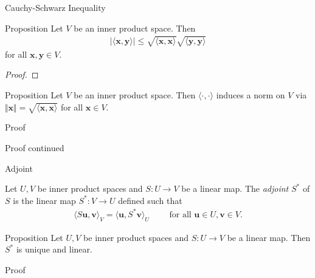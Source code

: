 \documentclass [aspectratio=169]{beamer}
\newcommand{\bu}{{\mathbf{u}}}
\newcommand{\bv}{{\mathbf{v}}}
\newcommand{\bx}{{\mathbf{x}}}
\newcommand{\by}{{\mathbf{y}}}
\newcommand{\innerprod}[1]{\langle #1 \rangle}
\begin{document}
\begin{frame}{Cauchy-Schwarz Inequality}
\begin{exampleblock}{Proposition}
Let $V$ be an inner product space. Then 
\begin{align*}
    \vert \innerprod{\bx,\by}\vert \leq \sqrt{\innerprod{\bx,\bx}}\sqrt{\innerprod{\by,\by}}
\end{align*}
for all $\bx,\by\in V$.
\end{exampleblock}
\end{frame}

\begin{frame}
\begin{proof}
\vspace{6cm}
\end{proof}
\end{frame}


\begin{frame}
\begin{exampleblock}{Proposition}
Let $V$ be an inner product space. Then $\innerprod{\cdot,\cdot}$ induces a norm on $V$ via $\Vert \bx\Vert =\sqrt{\innerprod{\bx,\bx}} $ for all $\bx \in V$.
\end{exampleblock}

\begin{block}{Proof}
\vspace{4cm}
\end{block}
\end{frame}

\begin{frame}
\begin{block}{Proof continued}
\vspace{4cm}
\end{block}
\vspace{1.5cm}
\end{frame}


\begin{frame}{Adjoint}
\begin{definition}
Let $U,V$ be inner product spaces and $S\colon U \to V$ be a linear map. The \emph{adjoint} $S^*$ of $S$ is the linear map $S^*\colon V \to U$ defined such that 
\begin{align*}
    \innerprod{S\bu,\bv}_V = \innerprod{\bu,S^*\bv}_U \qquad \text{ for all } \bu\in U, \bv\in V.
\end{align*}
\end{definition}
\end{frame}


\begin{frame}
\begin{exampleblock}{Proposition}
Let $U,V$ be inner product spaces and $S\colon U \to V$ be a linear map. Then $S^*$ is unique and linear.
\end{exampleblock}

\begin{block}{Proof}
\vspace{4cm}
\end{block}
\end{frame}
\end{document}
